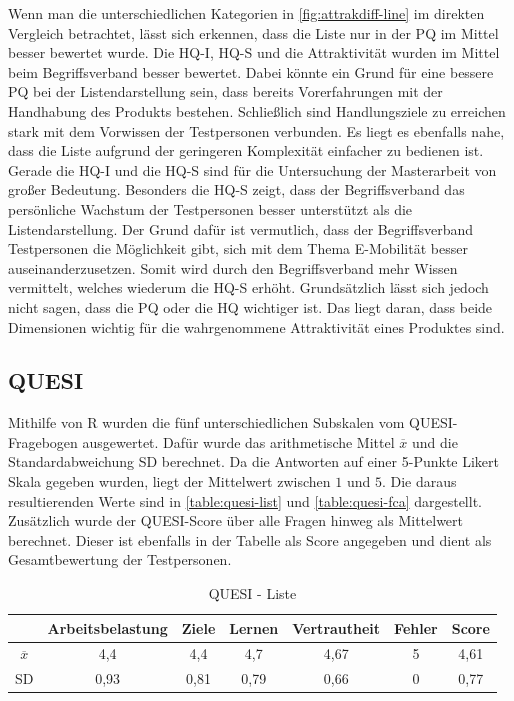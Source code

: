 Wenn man die unterschiedlichen Kategorien in \autoref{fig:attrakdiff-line} im direkten Vergleich betrachtet, lässt sich erkennen, dass die Liste nur in der \ac{PQ} im Mittel besser bewertet wurde.
Die \ac{HQ-I}, \ac{HQ-S} und die Attraktivität wurden im Mittel beim Begriffsverband besser bewertet.
Dabei könnte ein Grund für eine bessere \ac{PQ} bei der Listendarstellung sein, dass bereits Vorerfahrungen mit der Handhabung des Produkts bestehen.
Schließlich sind Handlungsziele zu erreichen stark mit dem Vorwissen der Testpersonen verbunden.
Es liegt es ebenfalls nahe, dass die Liste aufgrund der geringeren Komplexität einfacher zu bedienen ist.\\

Gerade die \ac{HQ-I} und die \ac{HQ-S} sind für die Untersuchung der Masterarbeit von großer Bedeutung.
Besonders die \ac{HQ-S} zeigt, dass der Begriffsverband das persönliche Wachstum der Testpersonen besser unterstützt als die Listendarstellung.
Der Grund dafür ist vermutlich, dass der Begriffsverband Testpersonen die Möglichkeit gibt, sich mit dem Thema E-Mobilität besser auseinanderzusetzen.
Somit wird durch den Begriffsverband mehr Wissen vermittelt, welches wiederum die \ac{HQ-S} erhöht.
Grundsätzlich lässt sich jedoch nicht sagen, dass die \ac{PQ} oder die \ac{HQ} wichtiger ist.
Das liegt daran, dass beide Dimensionen wichtig für die wahrgenommene Attraktivität eines Produktes sind.

\subsection{QUESI}
Mithilfe von R wurden die fünf unterschiedlichen Subskalen vom \ac{QUESI}-Fragebogen ausgewertet.
Dafür wurde das arithmetische Mittel $\overline{x}$ und die Standardabweichung SD berechnet.
Da die Antworten auf einer 5-Punkte Likert Skala gegeben wurden, liegt der Mittelwert zwischen $1$ und $5$.
Die daraus resultierenden Werte sind in \autoref{table:quesi-list} und \autoref{table:quesi-fca} dargestellt.
Zusätzlich wurde der \ac{QUESI}-Score über alle Fragen hinweg als Mittelwert berechnet.
Dieser ist ebenfalls in der Tabelle als Score angegeben und dient als Gesamtbewertung der Testpersonen.

\begin{center}
    \begin{table}[!ht]
        \centering
        \begin{tabular}{|l|c|c|c|c|c|c|}
            \hline
                                                 & Arbeitsbelastung & Ziele & Lernen & Vertrautheit & Fehler & Score \\ \hline \hline
            \multicolumn{1}{|c|}{$\overline{x}$} & 4,4              & 4,4   & 4,7    & 4,67         & 5      & 4,61  \\ \hline
            \multicolumn{1}{|c|}{SD}             & 0,93             & 0,81  & 0,79   & 0,66         & 0      & 0,77  \\ \hline
        \end{tabular}
        \caption{QUESI - Liste}
        \label{table:quesi-list}
    \end{table}
\end{center}

